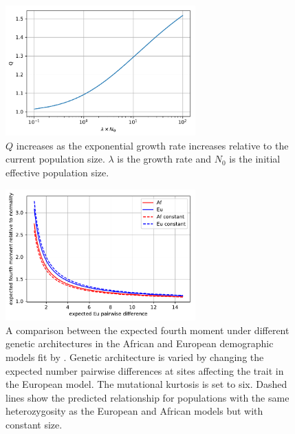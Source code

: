 \begin{figure}
\centering
\includegraphics[width=0.65\textwidth]{figures/exp_growth.pdf}
\caption{$Q$ increases as the exponential growth rate increases relative to the current
population size. $\lambda$ is the growth rate and $N_0$ is the initial effective population
size.}
\label{fig:Qexp}
\end{figure}

\begin{figure}
\centering
\includegraphics[width=0.65\textwidth]{figures/af_eu_kurt.pdf}
\caption{A comparison between the expected fourth moment under different genetic
architectures in the African and European demographic models fit
by \citet{Tennessen2012}. Genetic architecture is varied by changing the
expected number pairwise differences at sites affecting the trait in the
European model. The mutational kurtosis is set to six. Dashed lines show the
predicted relationship for populations with the same heterozygosity as the
European and African models but with constant size.}
\label{fig:afeucomp}
\end{figure}

